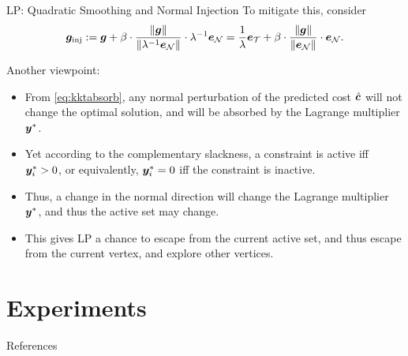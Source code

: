\documentclass[10pt,aspectratio=169,xcolor=dvipsnames]{beamer}
\begin{document}
\begin{frame}[allowframebreaks]{LP: Quadratic Smoothing and Normal Injection}
    To mitigate this, consider
    \begin{equation}
        {\bm{g}}_{\text{inj}} := {\bm{g}} + \beta \cdot \frac{\|{\bm{g}}\|}{\|\lambda^{-1} {\bm{e}}_{\mathcal{N}}\|} \cdot \lambda^{-1} {\bm{e}}_{\mathcal{N}} = \frac{1}{\lambda}{\bm{e}}_{\mathcal{T}} + \beta \cdot \frac{\|{\bm{g}}\|}{\|{\bm{e}}_{\mathcal{N}}\|} \cdot {\bm{e}}_{\mathcal{N}}.
    \end{equation}

    \begin{block}{Another viewpoint:}
        \begin{itemize}
        \item From \eqref{eq:kktabsorb}, any normal perturbation of the predicted cost $\hat{{\bm{c}}}$ will not change the optimal solution, and will be absorbed by the Lagrange multiplier ${\bm{y}}^*$.
        \item Yet according to the complementary slackness, a constraint is active iff ${\bm{y}}^*_i > 0$, or equivalently, ${\bm{y}}^*_i = 0$ iff the constraint is inactive.
        \item  Thus, a change in the normal direction will change the Lagrange multiplier ${\bm{y}}^*$, and thus the active set may change.
        \item This gives LP a chance to escape from the current active set, and thus escape from the current vertex, and explore other vertices.
        \end{itemize}

    \end{block}



\end{frame}


\section{Experiments}

\begin{frame}
    \sectionpage
\end{frame}








\begin{frame}{References}
    \footnotesize
    
    
\end{frame}

\end{document}
